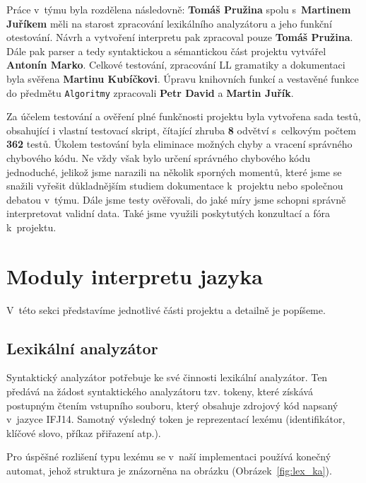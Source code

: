 \documentclass[12pt,a4paper,titlepage,final]{article}
\begin{document}
Práce v~týmu byla rozdělena následovně: \textbf{Tomáš Pružina} spolu s~\textbf{Martinem Juříkem} měli na starost zpracování lexikálního analyzátoru a jeho funkční otestování. Návrh a vytvoření interpretu pak zpracoval pouze \textbf{Tomáš Pružina}. Dále pak parser a tedy syntaktickou a sémantickou část projektu vytvářel \textbf{Antonín Marko}. Celkové testování, zpracování LL gramatiky a dokumentaci byla svěřena \textbf{Martinu Kubíčkovi}. Úpravu knihovních funkcí a vestavěné funkce do předmětu \verb|Algoritmy| zpracovali \textbf{Petr David} a \textbf{Martin Juřík}.

Za účelem testování a ověření plné funkčnosti projektu byla vytvořena sada testů, obsahující i vlastní testovací skript, čítající zhruba \textbf{8} odvětví s~celkovým počtem \textbf{362} testů. Úkolem testování byla eliminace možných chyby a vracení správného chybového kódu. Ne vždy však bylo určení správného chybového kódu jednoduché, jelikož jsme narazili na několik sporných momentů, které jsme se snažili vyřešit důkladnějším studiem dokumentace k~projektu nebo společnou debatou v~týmu. Dále jsme testy ověřovali, do jaké míry jsme schopni správně interpretovat validní data. Také jsme využili poskytutých konzultací a fóra k~projektu.

\section{Moduly interpretu jazyka} \label{moduly_interpretu}

V~této sekci představíme jednotlivé části projektu a detailně je popíšeme.
\subsection{Lexikální analyzátor} \label{lexikalni_analyzator}

Syntaktický analyzátor potřebuje ke své činnosti lexikální analyzátor. Ten
předává na žádost syntaktického analyzátoru tzv. tokeny, které získává postupným
čtením vstupního souboru, který obsahuje zdrojový kód napsaný v~jazyce IFJ14.
Samotný výsledný token je reprezentací lexému (identifikátor, klíčové slovo,
příkaz přiřazení atp.).

Pro úspěšné rozlišení typu lexému se v~naší implementaci používá konečný
automat, jehož struktura je znázorněna na obrázku (Obrázek~\ref{fig:lex_ka}).
\end{document}
